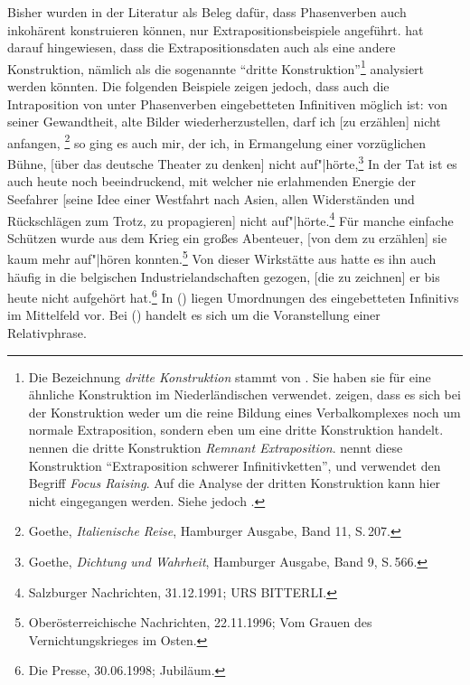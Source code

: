 \noindent
Bisher wurden in der Literatur als Beleg dafür, dass Phasenverben auch inkohärent konstruieren können,
nur Extrapositionsbeispiele angeführt. \citet{Reis2005a} hat darauf hingewiesen, dass
die Extrapositionsdaten auch als eine andere Konstruktion, nämlich als die sogenannte
"`dritte Konstruktion"'\footnote{
	Die Bezeichnung \emph{dritte Konstruktion} stammt von \citet*[42]{dBR89}.
	Sie haben sie für eine ähnliche Konstruktion im 
	Niederländischen verwendet. 
	 zeigen, dass es sich bei der Konstruktion weder 
	um die reine Bildung eines Verbalkomplexes noch um normale Extraposition,
	sondern eben um eine dritte Konstruktion handelt. \citet*{BBHR95}
        nennen die dritte Konstruktion \emph{Remnant Extraposition}.
%
        \citet*[]{Wunderlich80} nennt diese Konstruktion "`Extraposition schwerer Infinitivketten"', und
	\citet*[]{Uszkoreit87a} verwendet den Begriff \emph{Focus Raising}.
        Auf die Analyse der dritten Konstruktion kann hier nicht eingegangen werden.
        Siehe jedoch .%
} analysiert werden könnten. Die folgenden Beispiele zeigen jedoch,
dass auch die Intraposition von unter Phasenverben eingebetteten Infinitiven möglich ist:
\eal
\ex von seiner Gewandtheit, alte Bilder wiederherzustellen,  darf ich [zu erzählen] nicht anfangen,%
\footnote{
 Goethe, \emph{Italienische Reise}, Hamburger Ausgabe, Band 11, S.\,207.
}
\ex so ging es auch mir, der ich, in Ermangelung einer vorzüglichen Bühne, [über das deutsche Theater zu denken] nicht auf"|hörte,\footnote{
  Goethe, \emph{Dichtung und Wahrheit}, Hamburger Ausgabe, Band 9, S.\,566.
}
\ex\label{bsp-seefahrer} 
In der Tat ist es auch heute noch beeindruckend, 
    mit welcher nie erlahmenden Energie der Seefahrer 
    [seine Idee einer Westfahrt nach Asien, allen Widerständen und Rückschlägen zum Trotz, 
    zu propagieren] nicht auf"|hörte.\footnote{
      Salzburger Nachrichten, 31.12.1991; URS BITTERLI.%
    }
\zl
\eal
\ex Für manche einfache Schützen wurde aus dem Krieg ein großes Abenteuer, [von dem zu erzählen] 
    sie kaum mehr auf"|hören konnten.\footnote{
  Oberösterreichische Nachrichten, 22.11.1996; Vom Grauen des Vernichtungskrieges im Osten.%
}
\ex Von dieser Wirkstätte aus hatte es ihn auch häufig in die belgischen Industrielandschaften gezogen, [die zu zeichnen] er bis heute nicht aufgehört hat.\footnote{
  Die Presse, 30.06.1998; Jubiläum.%
}
\zl
In () liegen Umordnungen des eingebetteten Infinitivs im Mittelfeld vor. Bei () handelt
es sich um die Voranstellung einer Relativphrase.

